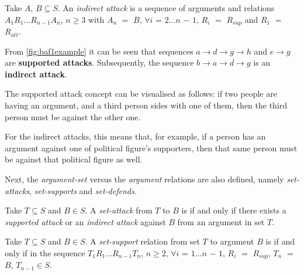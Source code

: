             \begin{definition}
                Take $A$, $B \subseteq S$. An \textit{indirect attack} is a sequence of arguments and relations $A_{1} R_{1} \ldots R_{n - 1} A_{n}$, $n \geq 3$ with $A_{n}$ $=$ $B$, $\forall i$ = $2 \ldots n$ $-$ $1$, $R_{i}$ $=$ $R_{sup}$ and $R_{1}$ $=$ $R_{att}$.
                \label{definition:definition12}
            \end{definition}
            
            \begin{exa}
                From \autoref{fig:baf1example} it can be seen that sequences $a \rightarrow d \rightarrow g \rightarrow h$ and $e \rightarrow g$ are \textbf{supported attacks}. Subsequently, the sequence $b \rightarrow a \rightarrow d \rightarrow g$ is an \textbf{indirect attack}.
                \label{exa:example11}
            \end{exa}
            
            The supported attack concept can be visualised as follows: if two people are having an argument, and a third person sides with one of them, then the third person must be against the other one.
            
            For the indirect attacks, this means that, for example, if a person has an argument against one of political figure's supporters, then that same person must be against that political figure as well.
            
            Next, the \textit{argument-set} versus the \textit{argument} relations are also defined, namely \textit{set-attacks}, \textit{set-supports} and \textit{set-defends}.
            
            \begin{definition}
                Take $T \subseteq S$ and $B \in S$. A \textit{set-attack} from $T$ to $B$ is if and only if there exists a \textit{supported attack} or an \textit{indirect attack} against $B$ from an argument in set $T$.
                \label{definition:definition13}
            \end{definition}
            
            \begin{definition}
                Take $T \subseteq S$ and $B \in S$. A \textit{set-support} relation from set $T$ to argument $B$ is if and only if in the sequence $T_{1} R_{1} \ldots R_{n - 1} T_{n}$, $n \geq 2$, $\forall i$ = $1 \ldots n$ $-$ $1$, $R_{i}$ $=$ $R_{sup}$, $T_{n}$ $=$ $B$, $T_{n - 1} \in S$.
                \label{definition:definition14}
            \end{definition}
            
